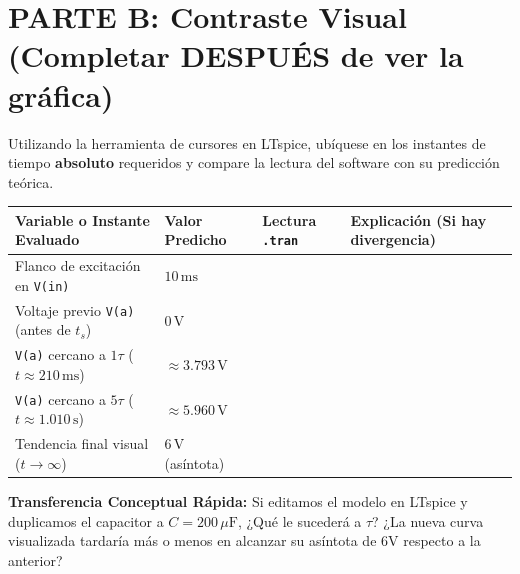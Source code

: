 \documentclass[11pt, a4paper]{article}
\begin{document}
\vspace{0.5cm}
\section*{PARTE B: Contraste Visual (Completar DESPUÉS de ver la gráfica)}
Utilizando la herramienta de cursores en LTspice, ubíquese en los instantes de tiempo \textbf{absoluto} requeridos y compare la lectura del software con su predicción teórica.

\vspace{0.3cm}
\renewcommand{\arraystretch}{1.5}
\noindent
\begin{tabularx}{\textwidth}{>{\RaggedRight\arraybackslash}X >{\centering\arraybackslash}p{2.5cm} >{\centering\arraybackslash}p{2.5cm} >{\RaggedRight\arraybackslash}X}
\toprule
\textbf{Variable o Instante Evaluado} & \textbf{Valor Predicho} & \textbf{Lectura \texttt{.tran}} & \textbf{Explicación (Si hay divergencia)} \\ 
\midrule
Flanco de excitación en \texttt{V(in)} & $10\,\text{ms}$ & & \\[0.6cm] 
Voltaje previo \texttt{V(a)} (antes de $t_s$) & $0\,\text{V}$ & & \\[0.6cm] 
\texttt{V(a)} cercano a $1\tau$ ($t \approx 210\,\text{ms}$) & $\approx 3.793\,\text{V}$ & & \\[0.6cm] 
\texttt{V(a)} cercano a $5\tau$ ($t \approx 1.010\,\text{s}$) & $\approx 5.960\,\text{V}$ & & \\[0.6cm] 
Tendencia final visual ($t \to \infty$) & $6\,\text{V}$ (asíntota) & & \\[0.2cm] 
\bottomrule
\end{tabularx}

\vspace{0.5cm}
\textbf{Transferencia Conceptual Rápida:} Si editamos el modelo en LTspice y duplicamos el capacitor a $C=200\,\mu\text{F}$, ¿Qué le sucederá a $\tau$? ¿La nueva curva visualizada tardaría más o menos en alcanzar su asíntota de 6V respecto a la anterior?
\vspace{1.5cm}
\end{document}
